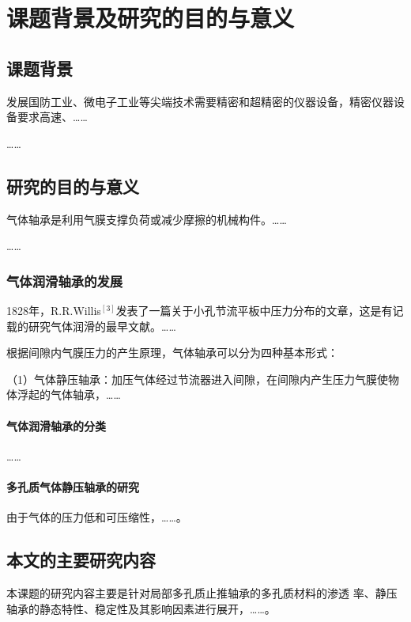 
\chapter{课题背景及研究的目的与意义}

\section{课题背景}

发展国防工业、微电子工业等尖端技术需要精密和超精密的仪器设备，精密仪器设备要求高速、\dots\dots

\dots\dots

\section{研究的目的与意义}

气体轴承是利用气膜支撑负荷或减少摩擦的机械构件。\dots\dots

\dots\dots

\subsection{气体润滑轴承的发展}

1828年，R.R.Willis$^{[3]}$发表了一篇关于小孔节流平板中压力分布的文章，这是有记载的研究气体润滑的最早文献。\dots\dots

根据间隙内气膜压力的产生原理，气体轴承可以分为四种基本形式：

（1）气体静压轴承：加压气体经过节流器进入间隙，在间隙内产生压力气膜使物体浮起的气体轴承，\dots\dots

\subsubsection{气体润滑轴承的分类}

\dots\dots

\subsubsection{多孔质气体静压轴承的研究}

由于气体的压力低和可压缩性，\dots\dots。

\section{本文的主要研究内容}

本课题的研究内容主要是针对局部多孔质止推轴承的多孔质材料的渗透
率、静压轴承的静态特性、稳定性及其影响因素进行展开，\dots\dots。
